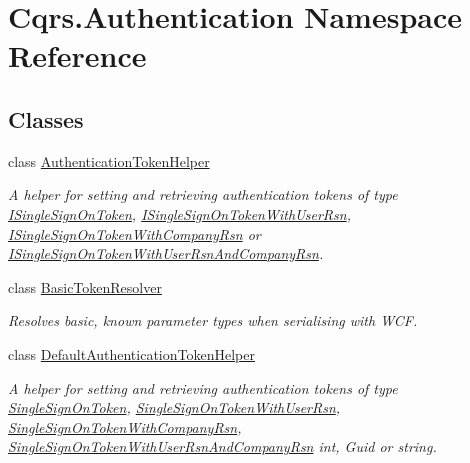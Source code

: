 \hypertarget{namespaceCqrs_1_1Authentication}{}\section{Cqrs.\+Authentication Namespace Reference}
\label{namespaceCqrs_1_1Authentication}
\subsection*{Classes}
\begin{DoxyCompactItemize}
\item 
class \hyperlink{classCqrs_1_1Authentication_1_1AuthenticationTokenHelper}{Authentication\+Token\+Helper}
\begin{DoxyCompactList}\small\item\em A helper for setting and retrieving authentication tokens of type \hyperlink{interfaceCqrs_1_1Authentication_1_1ISingleSignOnToken}{I\+Single\+Sign\+On\+Token}, \hyperlink{interfaceCqrs_1_1Authentication_1_1ISingleSignOnTokenWithUserRsn}{I\+Single\+Sign\+On\+Token\+With\+User\+Rsn}, \hyperlink{interfaceCqrs_1_1Authentication_1_1ISingleSignOnTokenWithCompanyRsn}{I\+Single\+Sign\+On\+Token\+With\+Company\+Rsn} or \hyperlink{interfaceCqrs_1_1Authentication_1_1ISingleSignOnTokenWithUserRsnAndCompanyRsn}{I\+Single\+Sign\+On\+Token\+With\+User\+Rsn\+And\+Company\+Rsn}. \end{DoxyCompactList}\item 
class \hyperlink{classCqrs_1_1Authentication_1_1BasicTokenResolver}{Basic\+Token\+Resolver}
\begin{DoxyCompactList}\small\item\em Resolves basic, known parameter types when serialising with W\+CF. \end{DoxyCompactList}\item 
class \hyperlink{classCqrs_1_1Authentication_1_1DefaultAuthenticationTokenHelper}{Default\+Authentication\+Token\+Helper}
\begin{DoxyCompactList}\small\item\em A helper for setting and retrieving authentication tokens of type \hyperlink{classCqrs_1_1Authentication_1_1SingleSignOnToken}{Single\+Sign\+On\+Token}, \hyperlink{classCqrs_1_1Authentication_1_1SingleSignOnTokenWithUserRsn}{Single\+Sign\+On\+Token\+With\+User\+Rsn}, \hyperlink{classCqrs_1_1Authentication_1_1SingleSignOnTokenWithCompanyRsn}{Single\+Sign\+On\+Token\+With\+Company\+Rsn}, \hyperlink{classCqrs_1_1Authentication_1_1SingleSignOnTokenWithUserRsnAndCompanyRsn}{Single\+Sign\+On\+Token\+With\+User\+Rsn\+And\+Company\+Rsn} int, Guid or string. \end{DoxyCompactList}\item 

\end{DoxyCompactItemize}

